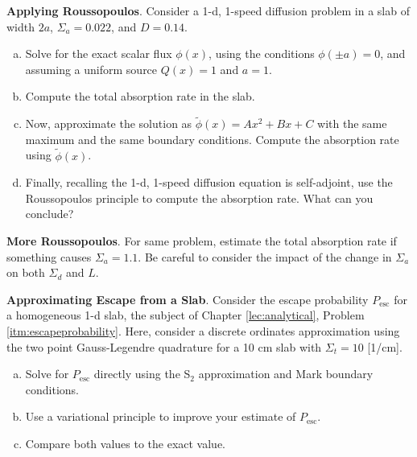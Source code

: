 \begin{exercises}
  \item  \textbf{Applying Roussopoulos}. 
    Consider a 1-d, 1-speed diffusion problem in a slab of 
    width $2a$, $\Sigma_a = 0.022$, and $D = 0.14$. 
    \begin{enumerate}[a.]
      \item Solve for the exact scalar flux $\phi(x)$, using the 
            conditions $\phi(\pm a)=0$, and
            assuming a uniform source $Q(x) = 1$ and $a=1$.
      \item Compute the total absorption rate in the slab.
      \item Now, approximate the solution as 
            $\tilde{\phi}(x) = Ax^2 + Bx +C$ with the same maximum 
            and the same boundary conditions.  Compute the absorption rate  
            using $\tilde{\phi}(x)$.
      \item Finally, recalling the 1-d, 1-speed diffusion equation is 
            self-adjoint, use the Roussopoulos principle to compute the 
            absorption rate.  What can you conclude? 
    \end{enumerate}

  \item \textbf{More Roussopoulos}. 
    For same problem, estimate the total absorption rate if something 
    causes $\Sigma_a = 1.1$.  Be careful to consider the impact of the change 
    in $\Sigma_a$ on both $\Sigma_d$ and $L$.

  \item \textbf{Approximating Escape from a Slab}. 
    Consider the escape probability $P_{\text{esc}}$ for a homogeneous 1-d slab, 
    the subject of 
    Chapter \ref{lec:analytical}, Problem \ref{itm:escapeprobability}.  
    Here, consider a discrete ordinates approximation using the 
    two point Gauss-Legendre quadrature for a 10 cm slab 
    with $\Sigma_t = 10$ [1/cm].
    \begin{enumerate}[a.]
      \item Solve for $P_{\text{esc}}$ directly using the S$_{\text{2}}$ 
            approximation and Mark boundary conditions.  
      \item Use a variational principle to improve 
            your estimate of $P_{\text{esc}}$. 
      \item Compare both values to the exact value.
    \end{enumerate}

\end{exercises}